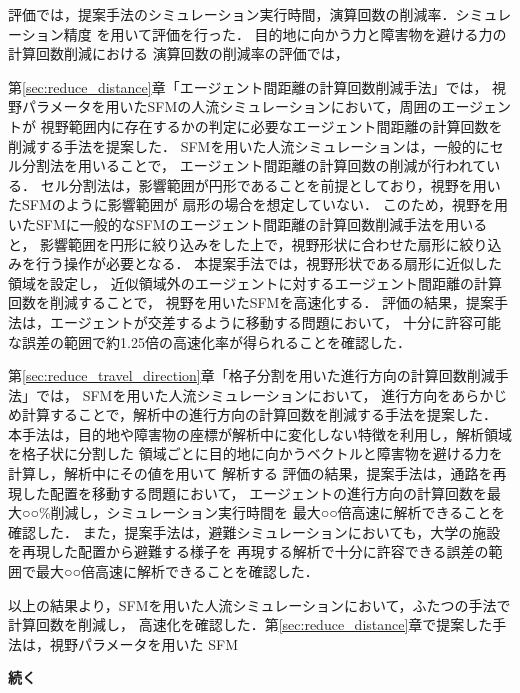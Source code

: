評価では，提案手法のシミュレーション実行時間，演算回数の削減率．シミュレーション精度
を用いて評価を行った．
目的地に向かう力と障害物を避ける力の計算回数削減における
演算回数の削減率の評価では，




第\ref{sec:reduce_distance}章「エージェント間距離の計算回数削減手法」では，
視野パラメータを用いたSFMの人流シミュレーションにおいて，周囲のエージェントが
視野範囲内に存在するかの判定に必要なエージェント間距離の計算回数を削減する手法を提案した．
SFMを用いた人流シミュレーションは，一般的にセル分割法を用いることで，
エージェント間距離の計算回数の削減が行われている．
セル分割法は，影響範囲が円形であることを前提としており，視野を用いたSFMのように影響範囲が
扇形の場合を想定していない．
このため，視野を用いたSFMに一般的なSFMのエージェント間距離の計算回数削減手法を用いると，
影響範囲を円形に絞り込みをした上で，視野形状に合わせた扇形に絞り込みを行う操作が必要となる．
本提案手法では，視野形状である扇形に近似した領域を設定し，
近似領域外のエージェントに対するエージェント間距離の計算回数を削減することで，
視野を用いたSFMを高速化する．
評価の結果，提案手法は，エージェントが交差するように移動する問題において，
十分に許容可能な誤差の範囲で約1.25倍の高速化率が得られることを確認した．


第\ref{sec:reduce_travel_direction}章「格子分割を用いた進行方向の計算回数削減手法」では，
SFMを用いた人流シミュレーションにおいて，
進行方向をあらかじめ計算することで，解析中の進行方向の計算回数を削減する手法を提案した．
本手法は，目的地や障害物の座標が解析中に変化しない特徴を利用し，解析領域を格子状に分割した
領域ごとに目的地に向かうベクトルと障害物を避ける力を計算し，解析中にその値を用いて
解析する
評価の結果，提案手法は，通路を再現した配置を移動する問題において，
エージェントの進行方向の計算回数を最大○○\%削減し，シミュレーション実行時間を
最大○○倍高速に解析できることを確認した．
また，提案手法は，避難シミュレーションにおいても，大学の施設を再現した配置から避難する様子を
再現する解析で十分に許容できる誤差の範囲で最大○○倍高速に解析できることを確認した．

以上の結果より，SFMを用いた人流シミュレーションにおいて，ふたつの手法で計算回数を削減し，
高速化を確認した．第\ref{sec:reduce_distance}章で提案した手法は，視野パラメータを用いた
SFM

\textbf{続く}

\fi


% 
%
